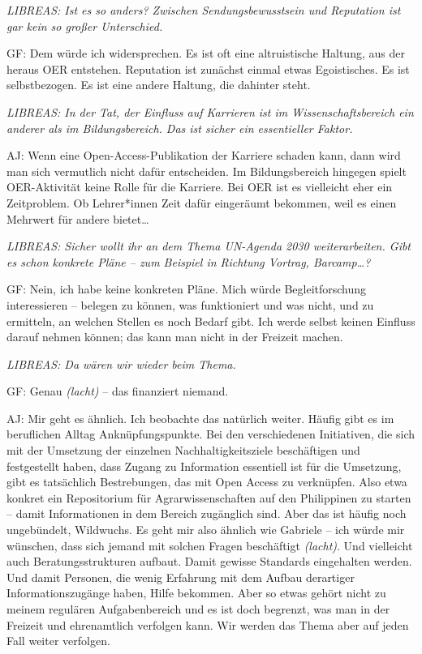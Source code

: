 \documentclass[a4paper,
fontsize=11pt,
oneside,
numbers=noperiodatend,
parskip=half-,
bibliography=totoc,
final
]{scrartcl}
\begin{document}
\emph{LIBREAS: Ist es so anders? Zwischen Sendungsbewusstsein und
Reputation ist gar kein so großer Unterschied.}

GF: Dem würde ich widersprechen. Es ist oft eine altruistische Haltung,
aus der heraus OER entstehen. Reputation ist zunächst einmal etwas
Egoistisches. Es ist selbstbezogen. Es ist eine andere Haltung, die
dahinter steht.

\emph{LIBREAS: In der Tat, der Einfluss auf Karrieren ist im
Wissenschaftsbereich ein anderer als im Bildungsbereich. Das ist sicher
ein essentieller Faktor.}

AJ: Wenn eine Open-Access-Publikation der Karriere schaden kann, dann
wird man sich vermutlich nicht dafür entscheiden. Im Bildungsbereich
hingegen spielt OER-Aktivität keine Rolle für die Karriere. Bei OER ist
es vielleicht eher ein Zeitproblem. Ob Lehrer*innen Zeit dafür
eingeräumt bekommen, weil es einen Mehrwert für andere bietet\ldots{}

\emph{LIBREAS: Sicher wollt ihr an dem Thema UN-Agenda 2030
weiterarbeiten. Gibt es schon konkrete Pläne -- zum Beispiel in Richtung
Vortrag, Barcamp\ldots?}

GF: Nein, ich habe keine konkreten Pläne. Mich würde Begleitforschung
interessieren -- belegen zu können, was funktioniert und was nicht, und
zu ermitteln, an welchen Stellen es noch Bedarf gibt. Ich werde selbst
keinen Einfluss darauf nehmen können; das kann man nicht in der Freizeit
machen.

\emph{LIBREAS: Da wären wir wieder beim Thema.}

GF: Genau \emph{(lacht)} -- das finanziert niemand.

AJ: Mir geht es ähnlich. Ich beobachte das natürlich weiter. Häufig gibt
es im beruflichen Alltag Anknüpfungspunkte. Bei den verschiedenen
Initiativen, die sich mit der Umsetzung der einzelnen
Nachhaltigkeitsziele beschäftigen und festgestellt haben, dass Zugang zu
Information essentiell ist für die Umsetzung, gibt es tatsächlich
Bestrebungen, das mit Open Access zu verknüpfen. Also etwa konkret ein
Repositorium für Agrarwissenschaften auf den Philippinen zu starten --
damit Informationen in dem Bereich zugänglich sind. Aber das ist häufig
noch ungebündelt, Wildwuchs. Es geht mir also ähnlich wie Gabriele --
ich würde mir wünschen, dass sich jemand mit solchen Fragen beschäftigt
\emph{(lacht)}. Und vielleicht auch Beratungsstrukturen aufbaut. Damit
gewisse Standards eingehalten werden. Und damit Personen, die wenig
Erfahrung mit dem Aufbau derartiger Informationszugänge haben, Hilfe
bekommen. Aber so etwas gehört nicht zu meinem regulären Aufgabenbereich
und es ist doch begrenzt, was man in der Freizeit und ehrenamtlich
verfolgen kann. Wir werden das Thema aber auf jeden Fall weiter
verfolgen.
\end{document}
